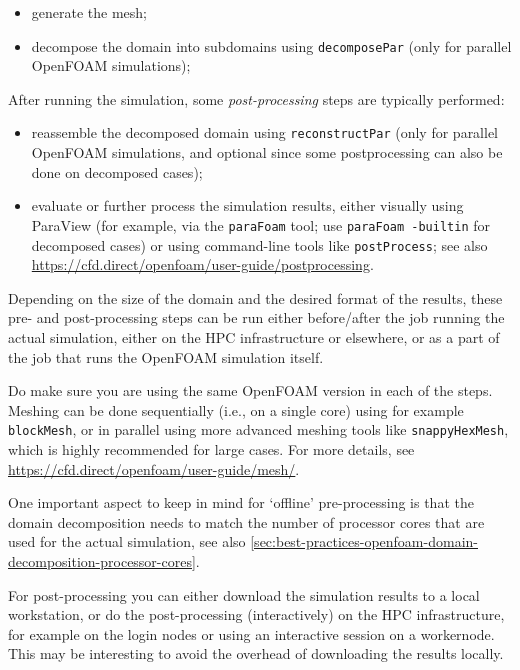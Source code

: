 \begin{itemize}
\item generate the mesh;
\item decompose the domain into subdomains using \lstinline|decomposePar| (only for parallel OpenFOAM simulations);
\end{itemize}

After running the simulation, some \emph{post-processing} steps are typically performed:

\begin{itemize}
\item reassemble the decomposed domain using \lstinline|reconstructPar| (only for parallel OpenFOAM simulations,
      and optional since some postprocessing can also be done on decomposed cases);
\item evaluate or further process the simulation results, either visually using ParaView
      (for example, via the \lstinline|paraFoam| tool; use \lstinline|paraFoam -builtin| for decomposed cases)
      or using command-line tools like \lstinline|postProcess|;
      see also \url{https://cfd.direct/openfoam/user-guide/postprocessing}.
\end{itemize}

Depending on the size of the domain and the desired format of the results, these pre- and post-processing
steps can be run either before/after the job running the actual simulation, either on the HPC infrastructure
or elsewhere, or as a part of the job that runs the OpenFOAM simulation itself.

Do make sure you are using the same OpenFOAM version in each of the steps.
Meshing can be done sequentially (i.e., on a single core) using for example \lstinline|blockMesh|,
or in parallel using more advanced meshing tools like \lstinline|snappyHexMesh|, which is highly recommended
for large cases. For more details, see \url{https://cfd.direct/openfoam/user-guide/mesh/}.

One important aspect to keep in mind for `offline' pre-processing is that the domain decomposition needs to match
the number of processor cores that are used for the actual simulation,
see also \autoref{sec:best-practices-openfoam-domain-decomposition-processor-cores}.

For post-processing you can either download the simulation results to a local workstation,
or do the post-processing (interactively) on the HPC infrastructure, for example on the login nodes
or using an interactive session on a workernode. This may be interesting to avoid the overhead of
downloading the results locally.

